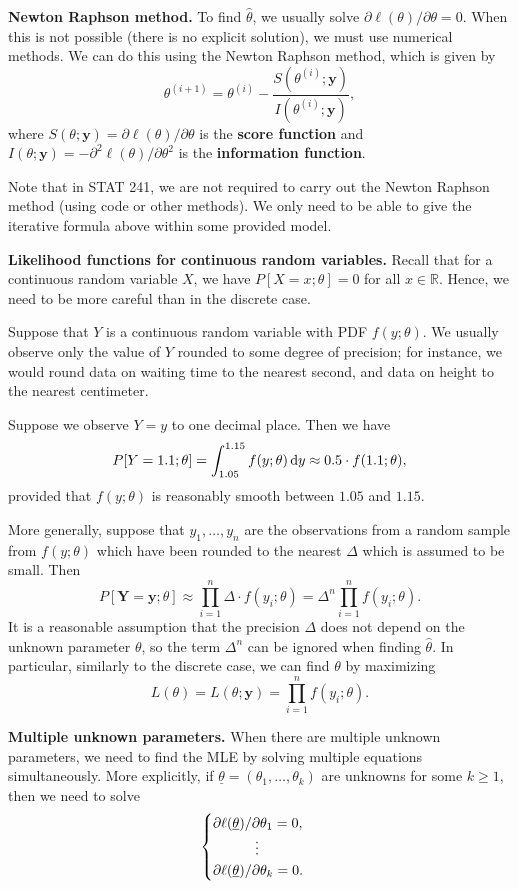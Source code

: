 \documentclass[10pt]{article}
\newcommand{\R}{\mathbb{R}}
\newcommand{\dd}{\,{\rm d}}
\theoremstyle{newstyle}
\begin{document}
{\bf Newton Raphson method.} To find $\hat\theta$, we usually solve 
$\partial\ell(\theta)/\partial\theta = 0$. When this is not possible 
(there is no explicit solution), we must use numerical methods. 
We can do this using the Newton Raphson method, which is given by 
\[ \theta^{(i+1)} = \theta^{(i)} - \frac{S(\theta^{(i)}; \mathbf{y})}{I(\theta^{(i)}; \mathbf{y})}, \]
where $S(\theta; \mathbf{y}) = \partial\ell(\theta)/\partial\theta$ is the {\bf score function}
and $I(\theta; \mathbf{y}) = -\partial^2\ell(\theta)/\partial\theta^2$ is the 
{\bf information function}. 

Note that in STAT 241, we are not required to carry out the Newton Raphson method (using 
code or other methods). We only need to be able to give the iterative formula above within 
some provided model. 

\newpage 
{\bf Likelihood functions for continuous random variables.} 
Recall that for a continuous random variable $X$, we have $P[X = x; \theta] = 0$ for all 
$x \in \R$. Hence, we need to be more careful than in the discrete case. 

Suppose that $Y$ is a continuous random variable with PDF $f(y; \theta)$. 
We usually observe only the value of $Y$ rounded to some degree of precision; for instance, 
we would round data on waiting time to the nearest second, and data on 
height to the nearest centimeter. 

Suppose we observe $Y = y$ to one decimal place. Then we have 
\[ P[Y = 1.1; \theta] = \int_{1.05}^{1.15} f(y; \theta)\dd y \approx 0.5 \cdot f(1.1; \theta), \]
provided that $f(y; \theta)$ is reasonably smooth between $1.05$ and $1.15$. 

More generally, suppose that $y_1, \dots, y_n$ are the observations from a random sample 
from $f(y; \theta)$ which have been rounded to the nearest $\Delta$ which is assumed 
to be small. Then 
\[ P[\mathbf{Y} = \mathbf{y}; \theta] \approx \prod_{i=1}^n \Delta \cdot f(y_i; \theta) 
= \Delta^n \prod_{i=1}^n f(y_i; \theta). \]
It is a reasonable assumption that the precision $\Delta$ does not depend on the 
unknown parameter $\theta$, so the term $\Delta^n$ can be ignored when finding $\hat\theta$. 
In particular, similarly to the discrete case, we can find $\theta$ by maximizing 
\[ L(\theta) = L(\theta; \mathbf{y}) = \prod_{i=1}^n f(y_i; \theta). \]

{\bf Multiple unknown parameters.} When there are multiple unknown parameters, 
we need to find the MLE by solving multiple equations simultaneously. More explicitly, 
if $\underline\theta = (\theta_1, \dots, \theta_k)$ are unknowns for some $k \geq 1$, then 
we need to solve 
\[ \begin{cases} \partial\ell(\underline\theta)/\partial\theta_1 = 0, \\ \hspace{7ex} \vdots \\ 
\partial\ell(\underline\theta)/\partial\theta_k = 0. \end{cases} \]
\end{document}
